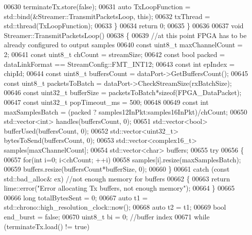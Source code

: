 \begin{DoxyCode}
00630         terminateTx.store(\textcolor{keyword}{false});
00631         \textcolor{keyword}{auto} TxLoopFunction = std::bind(&Streamer::TransmitPacketsLoop, \textcolor{keyword}{this});
00632         txThread = std::thread(TxLoopFunction);
00633     \}
00634     \textcolor{keywordflow}{return} 0;
00635 \}
00636 
00637 \textcolor{keywordtype}{void} Streamer::TransmitPacketsLoop()
00638 \{
00639     \textcolor{comment}{//at this point FPGA has to be already configured to output samples}
00640     \textcolor{keyword}{const} uint8\_t maxChannelCount = 2;
00641     \textcolor{keyword}{const} uint8\_t chCount = streamSize;
00642     \textcolor{keyword}{const} \textcolor{keywordtype}{bool} packed = dataLinkFormat == StreamConfig::FMT_INT12;
00643     \textcolor{keyword}{const} \textcolor{keywordtype}{int} epIndex = chipId;
00644     \textcolor{keyword}{const} uint8\_t buffersCount = dataPort->GetBuffersCount();
00645     \textcolor{keyword}{const} uint8\_t packetsToBatch = dataPort->CheckStreamSize(rxBatchSize);
00646     \textcolor{keyword}{const} uint32\_t bufferSize = packetsToBatch*\textcolor{keyword}{sizeof}(FPGA_DataPacket);
00647     \textcolor{keyword}{const} uint32\_t popTimeout\_ms = 500;
00648 
00649     \textcolor{keyword}{const} \textcolor{keywordtype}{int} maxSamplesBatch = (packed ? samples12InPkt:samples16InPkt)/chCount;
00650     std::vector<int> handles(buffersCount, 0);
00651     std::vector<bool> bufferUsed(buffersCount, 0);
00652     std::vector<uint32\_t> bytesToSend(buffersCount, 0);
00653     std::vector<complex16\_t> samples[maxChannelCount];
00654     std::vector<char> buffers;
00655     \textcolor{keywordflow}{try}
00656     \{
00657         \textcolor{keywordflow}{for}(\textcolor{keywordtype}{int} i=0; i<chCount; ++i)
00658             samples[i].resize(maxSamplesBatch);
00659         buffers.resize(buffersCount*bufferSize, 0);
00660     \}
00661     \textcolor{keywordflow}{catch} (\textcolor{keyword}{const} std::bad\_alloc& ex) \textcolor{comment}{//not enough memory for buffers}
00662     \{
00663         \textcolor{keywordflow}{return} lime::error(\textcolor{stringliteral}{"Error allocating Tx buffers, not enough memory"});
00664     \}
00665 
00666     \textcolor{keywordtype}{long} totalBytesSent = 0;
00667     \textcolor{keyword}{auto} t1 = std::chrono::high\_resolution\_clock::now();
00668     \textcolor{keyword}{auto} t2 = t1;
00669     \textcolor{keywordtype}{bool} end\_burst = \textcolor{keyword}{false};
00670     uint8\_t bi = 0; \textcolor{comment}{//buffer index}
00671     \textcolor{keywordflow}{while} (terminateTx.load() != \textcolor{keyword}{true})

\end{DoxyCode}
